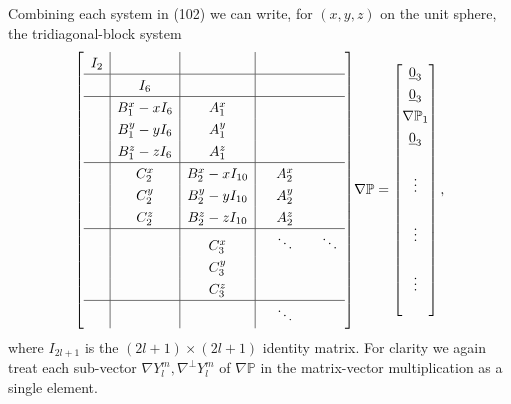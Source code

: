 \documentclass[11pt, oneside]{article}   	%
\newcommand{\gradP}{\nabla\mathbb{P}}
\newcommand{\gradYlm}{\nabla Y^m_l}
\newcommand{\gradpYlm}{\nabla^\perp Y^m_l}
\begin{document}
Combining each system in (102) we can write, for \((x,y,z)\) on the unit sphere, the tridiagonal-block system
\begin{align}
\renewcommand\arraystretch{1.3}
\mleft[
\begin{array}{c|c|c|cc}
		I_{2}  & & & \\
		\hline
		& I_{6}  & & & \\
		\hline 
		& B^x_1 - xI_6 & A^x_1 & & \\
		& B^y_1 - yI_6 & A^y_1 & & \\
		& B^z_1 - zI_6 & A^z_1 & & \\
		\hline 
		& C^x_2 & B^x_2 - xI_{10} & \quad A^x_2 \quad & \\
		& C^y_2 & B^y_2 - yI_{10} & \quad A^y_2 \quad & \\
		& C^z_2 & B^z_2 - zI_{10} & \quad A^z_2 \quad & \\
		\hline
		& & C^x_3 & \ddots & \ddots \\
		& & C^y_3 & & \\
		& & C^z_3 & & \\
		\hline
		& & & \ddots &
\end{array}
\mright]
\gradP
=
\begin{bmatrix}
	\underline{0}_3 \\ \underline{0}_3 \\ \gradP_1 \\ \underline{0}_3 \\ \\ \vdots \\ \\ \vdots \\ \\ \vdots \\ \\
\end{bmatrix},
\end{align}
where \(I_{2l+1}\) is the \((2l+1)\times(2l+1)\) identity matrix. For clarity we again treat each sub-vector \(\gradYlm, \gradpYlm\) of \(\gradP\) in the matrix-vector multiplication as a single element.
\end{document}
